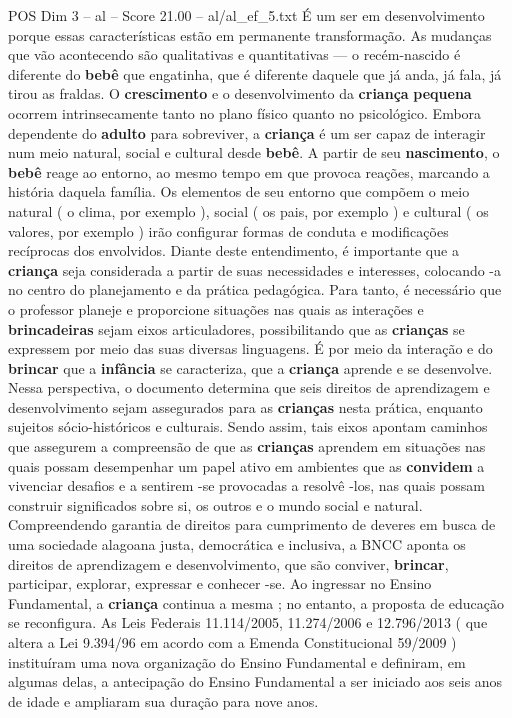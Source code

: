 \begin{textsample}{POS Dim 3 – al – Score 21.00 – al/al\_ef\_5.txt}
É um ser em desenvolvimento porque essas características estão em permanente transformação.
As mudanças que vão acontecendo são qualitativas e quantitativas — o recém-nascido é diferente do \textbf{bebê} que engatinha, que é diferente daquele que já anda, já fala, já tirou as fraldas.
O \textbf{crescimento} e o desenvolvimento da \textbf{criança} \textbf{pequena} ocorrem intrinsecamente tanto no plano físico quanto no psicológico.
Embora dependente do \textbf{adulto} para sobreviver, a \textbf{criança} é um ser capaz de interagir num meio natural, social e cultural desde \textbf{bebê}.
A partir de seu \textbf{nascimento}, o \textbf{bebê} reage ao entorno, ao mesmo tempo em que provoca reações, marcando a história daquela família.
Os elementos de seu entorno que compõem o meio natural ( o clima, por exemplo ), social ( os pais, por exemplo ) e cultural ( os valores, por exemplo ) irão configurar formas de conduta e modificações recíprocas dos envolvidos.
Diante deste entendimento, é importante que a \textbf{criança} seja considerada a partir de suas necessidades e interesses, colocando -a no centro do planejamento e da prática pedagógica.
Para tanto, é necessário que o professor planeje e proporcione situações nas quais as interações e \textbf{brincadeiras} sejam eixos articuladores, possibilitando que as \textbf{crianças} se expressem por meio das suas diversas linguagens.
É por meio da interação e do \textbf{brincar} que a \textbf{infância} se caracteriza, que a \textbf{criança} aprende e se desenvolve.
Nessa perspectiva, o documento determina que seis direitos de aprendizagem e desenvolvimento sejam assegurados para as \textbf{crianças} nesta prática, enquanto sujeitos sócio-históricos e culturais.
Sendo assim, tais eixos apontam caminhos que assegurem a compreensão de que as \textbf{crianças} aprendem em situações nas quais possam desempenhar um papel ativo em ambientes que as \textbf{convidem} a vivenciar desafios e a sentirem -se provocadas a resolvê -los, nas quais possam construir significados sobre si, os outros e o mundo social e natural.
Compreendendo garantia de direitos para cumprimento de deveres em busca de uma sociedade alagoana justa, democrática e inclusiva, a BNCC aponta os direitos de aprendizagem e desenvolvimento, que são conviver, \textbf{brincar}, participar, explorar, expressar e conhecer -se.
Ao ingressar no Ensino Fundamental, a \textbf{criança} continua a mesma ; no entanto, a proposta de educação se reconfigura.
As Leis Federais 11.114/2005, 11.274/2006 e 12.796/2013 ( que altera a Lei 9.394/96 em acordo com a Emenda Constitucional 59/2009 ) instituíram uma nova organização do Ensino Fundamental e definiram, em algumas delas, a antecipação do Ensino Fundamental a ser iniciado aos seis anos de idade e ampliaram sua duração para nove anos.

\end{textsample}
